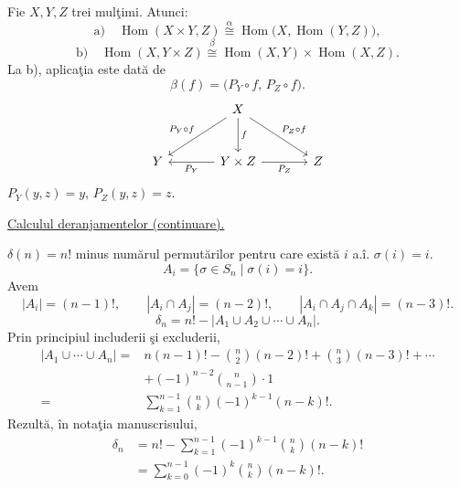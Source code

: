 \medskip
\noindent{}

\medskip
\noindent{}\quad Fie $X,Y,Z$ trei mulţimi. Atunci:
\[
 \text{a)}\quad
 \operatorname{Hom}(X\times Y,Z)
 \overset{\alpha}{\cong}
 \operatorname{Hom}\bigl(X,\operatorname{Hom}(Y,Z)\bigr),
\]
\[
 \text{b)}\quad
 \operatorname{Hom}(X,Y\times Z)
 \overset{\beta}{\cong}
 \operatorname{Hom}(X,Y)\times\operatorname{Hom}(X,Z).
\]
\noindent La b), aplicaţia este dată de
\[
 \beta(f)=\bigl(P_Y\circ f,\,P_Z\circ f\bigr).
\]
\[
\begin{tikzcd}[column sep=large,row sep=large]
 & X \arrow[dl,swap,"P_Y\circ f"] \arrow[d,"f"]
     \arrow[dr,"P_Z\circ f"] & \\
 Y & Y\times Z \arrow[l,"P_Y"] \arrow[r,swap,"P_Z"] & Z
\end{tikzcd}
\]
\noindent $P_Y(y,z)=y$, $P_Z(y,z)=z$.

\bigskip
\noindent{}\quad \underline{Calculul deranjamentelor (continuare).}

\noindent $\delta(n)=n!$ minus numărul permutărilor pentru care
 există $i$ a.î. $\sigma(i)=i$.
\[
 A_i=\{\sigma\in S_n\mid\sigma(i)=i\}.
\]
\noindent Avem
\[
 |A_i|=(n-1)!,\qquad
 |A_i\cap A_j|=(n-2)!,\qquad
 |A_i\cap A_j\cap A_k|=(n-3)!.
\]
\[
 \delta_n=n!-\bigl|A_1\cup A_2\cup\cdots\cup A_n\bigr|.
\]
\noindent Prin principiul includerii şi excluderii,
\[
\begin{aligned}
 \bigl|A_1\cup\cdots\cup A_n\bigr|
  ={}&n(n-1)!-\binom{n}{2}(n-2)!+\binom{n}{3}(n-3)!+\cdots\\
     &+(-1)^{n-2}\binom{n}{n-1}\cdot1\\
  ={}&\sum_{k=1}^{n-1}\binom{n}{k}(-1)^{k-1}(n-k)!.
\end{aligned}
\]
\noindent Rezultă, în notaţia manuscrisului,
\[
\begin{aligned}
 \delta_n
  &=n!-\sum_{k=1}^{n-1}(-1)^{k-1}\binom{n}{k}(n-k)!\\
  &=\boxed{\displaystyle\sum_{k=0}^{n-1}(-1)^k\binom{n}{k}(n-k)!}.
\end{aligned}
\]

